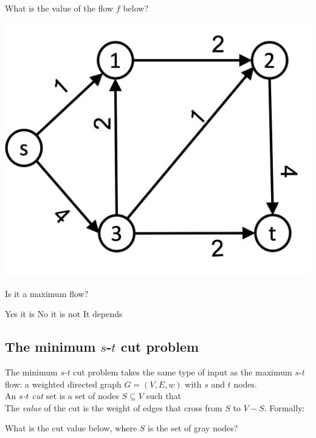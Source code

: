 \documentclass[11  pt]{article}
\begin{document}
	\begin{Qu}
		What is the value of the flow $f$ below? 
		\begin{center}
			\includegraphics[width = .5\linewidth]{flow2.png} \\
		\end{center}
		\begin{itemize}
		\end{itemize}
	\end{Qu}
	
	\vs{2cm}
	
	\begin{Qu}
		Is it a maximum flow?
		\begin{itemize}
			\aitem Yes it is
			\bitem No it is not
			\citem It depends
		\end{itemize}
	\end{Qu}
	
	\newpage
	
	\subsection{The minimum $s$-$t$ cut problem}
	The minimum $s$-$t$ cut problem takes the same type of input as the maximum $s$-$t$ flow: a weighted directed graph $G = (V,E,w)$ with $s$ and $t$ nodes.\\
	
	An \emph{$s$-$t$ cut} set is a set of nodes $S \subseteq V$ such that \\ %
	
	The \emph{value} of the cut is the weight of edges that cross from $S$ to $V- S$. Formally:\\

	\vs{4cm}
	
	What is the cut value below, where $S$ is the set of gray nodes? \\
	
\end{document}

